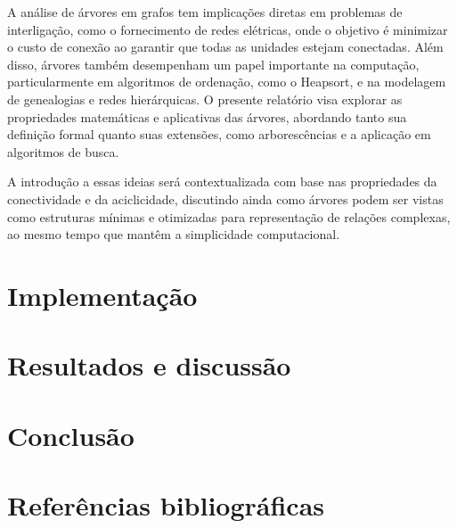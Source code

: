 \documentclass[12pt, a4paper]{scrreprt}
\begin{document}
A análise de árvores em grafos tem implicações diretas em problemas de interligação, como o fornecimento de redes elétricas, onde o objetivo é minimizar o custo de conexão ao garantir que todas as unidades estejam conectadas. Além disso, árvores também desempenham um papel importante na computação, particularmente em algoritmos de ordenação, como o Heapsort, e na modelagem de genealogias e redes hierárquicas. O presente relatório visa explorar as propriedades matemáticas e aplicativas das árvores, abordando tanto sua definição formal quanto suas extensões, como arborescências e a aplicação em algoritmos de busca.

A introdução a essas ideias será contextualizada com base nas propriedades da conectividade e da aciclicidade, discutindo ainda como árvores podem ser vistas como estruturas mínimas e otimizadas para representação de relações complexas, ao mesmo tempo que mantêm a simplicidade computacional.

\chapter{Implementação}

\chapter{Resultados e discussão}

\chapter{Conclusão}

\chapter{Referências bibliográficas}

\end{document}
